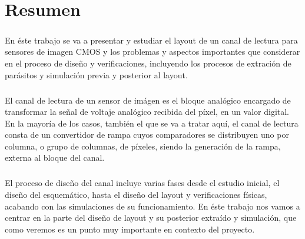 \chapter*{Resumen}
\label{cap:resumen}

\paragraph{}
En éste trabajo se va a presentar y estudiar el layout de un canal de lectura
para sensores de imagen CMOS y los problemas y aspectos importantes que considerar
en el proceso de diseño y verificaciones, incluyendo los procesos de extración de
parásitos y simulación previa y posterior al layout.

\paragraph{}
El canal de lectura de un sensor de imágen es el bloque analógico encargado de
transformar la señal de voltaje analógico recibida del píxel, en un valor digital.
En la mayoría de los casos, también el que se va a tratar aquí, el canal de lectura
consta de un convertidor de rampa cuyos comparadores se distribuyen uno por
columna, o grupo de columnas, de píxeles, siendo la generación de la rampa, externa
al bloque del canal.

\paragraph{}
El proceso de diseño del canal incluye varias fases desde el estudio inicial, el diseño
del esquemático, hasta el diseño del layout y verificaciones físicas, acabando con
las simulaciones de su funcionamiento. En éste trabajo nos vamos a centrar en la
parte del diseño de layout y su posterior extraído y simulación, que como veremos
es un punto muy importante en contexto del proyecto.
